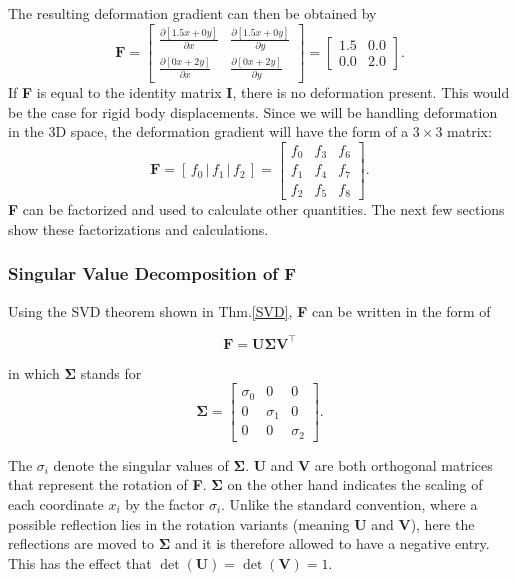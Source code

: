 The resulting deformation gradient can then be obtained by
\[
	\mathbf{F} = \begin{bmatrix} \frac{\partial [1.5x + 0y]}{\partial x} & \frac{\partial [1.5x + 0y]}{\partial y} \\ \frac{\partial [0x + 2y]}{\partial x} & \frac{\partial [0x + 2y]}{\partial y} \end{bmatrix} = \begin{bmatrix} 1.5 & 0.0 \\ 0.0 & 2.0 \end{bmatrix}.
\]
If \textbf{F} is equal to the identity matrix \textbf{I}, there is no deformation present. This would be the case for rigid body displacements. Since we will be handling deformation in the 3D space, the deformation gradient will have the form of a $3 \times 3$ matrix: 
\begin{equation}\label{eq:deformation_gradient}
\textbf{F} = \left[ \,f_0\, \bigg| \,f_1\, \bigg| \,f_2\, \right] = \begin{bmatrix} f_0 & f_3 & f_6 \\ f_1 & f_4 & f_7 \\ f_2 & f_5 & f_8 \end{bmatrix}.
\end{equation}
\textbf{F} can be factorized and used to calculate other quantities. The next few sections show these factorizations and calculations.

\subsubsection{Singular Value Decomposition of F}

Using the SVD theorem shown in Thm.\ref{SVD}, \textbf{F} can be written in the form of

\begin{equation}\label{eq:svd_gradient}
\mathbf{F} = \mathbf{U \Sigma V^\intercal}
\end{equation}

in which $\mathbf{\Sigma}$ stands for
\begin{equation}\label{eq:svd_simga}
\mathbf{\Sigma} = \left[\begin{matrix}  \sigma_0 & 0 & 0 \\ 0 & \sigma_1 & 0 \\ 0 & 0 & \sigma_2 \end{matrix}\right] .
\end{equation}

The $\sigma_i$ denote the singular values of $\mathbf{\Sigma}$.
\textbf{U} and $\mathbf{V}$ are both orthogonal matrices that represent the rotation of \textbf{F}. $\mathbf{\Sigma}$ on the other hand indicates the scaling of each coordinate $x_i$ by the factor $\sigma_i$. Unlike the standard convention, where a possible reflection lies in the rotation variants (meaning \textbf{U} and \textbf{V}), here the reflections are moved to $\mathbf{\Sigma}$ and it is therefore allowed to have a negative entry. This has the effect that $\operatorname{det}(\mathbf{U}) = \operatorname{det}(\mathbf{V}) =1$.


